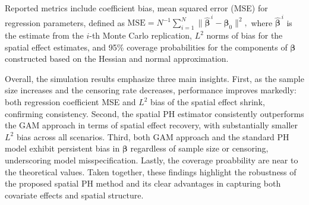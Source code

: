 \documentclass[11pt]{article}
\begin{document}
Reported metrics include coefficient bias, mean squared error (MSE) for regression parameters, defined as 
\( \mathrm{MSE} = N^{-1}\sum_{i=1}^N \|\hat{\boldsymbol{\beta}}^{\,i} - \boldsymbol{\beta}_0\|^2,\) where $\hat{\boldsymbol{\beta}}^{\,i}$ is the estimate from the $i$-th Monte Carlo replication, $L^2$ norms of bias for the spatial effect estimates, and 95\% coverage probabilities for the components of $\boldsymbol{\beta}$ constructed based on the Hessian and normal approximation.


Overall, the simulation results emphasize three main insights. First, as the sample size increases and the censoring rate decreases, performance improves markedly: both regression coefficient MSE and $L^2$ bias of the spatial effect shrink, confirming consistency. Second, the spatial PH estimator consistently outperforms the GAM approach in terms of spatial effect recovery, with substantially smaller $L^2$ bias across all scenarios. Third, both GAM approach and the standard PH model exhibit persistent bias in $\bm \beta$ regardless of sample size or censoring, underscoring model misspecification. Lastly, the coverage proabbility are near to the theoretical values. Taken together, these findings highlight the robustness of the proposed spatial PH method and its clear advantages in capturing both covariate effects and spatial structure.
\end{document}
